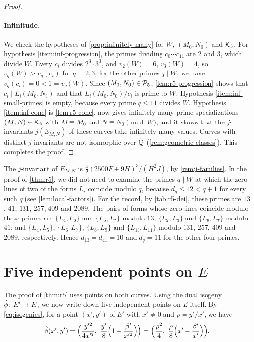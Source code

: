 \begin{proof}
\paragraph{Infinitude.} We check the hypotheses of \cref{prop:infinitely-many} for $W$, $(M_0,N_0)$ and $\mathcal K_5$. For hypothesis \ref{item:inf-progression}, the primes dividing $c_0\cdots c_{11}$ are $2$ and $3$, which divide $W$. Every $c_i$ divides $2^3\cdot3^3$, and $v_2(W)=6$, $v_3(W)=4$, so $v_q(W)>v_q(c_i)$ for $q=2,3$; for the other primes $q\mid W$, we have $v_q(c_i)=0<1=v_q(W)$. Since $(M_0,N_0)\in\mathcal P_5$, \cref{lem:r5-progression} shows that $c_i\mid L_i(M_0,N_0)$ and that $L_i(M_0,N_0)/c_i$ is prime to $W$. Hypothesis \ref{item:inf-small-primes} is empty, because every prime $q\le11$ divides $W$. Hypothesis \ref{item:inf-cone} is \cref{lem:r5-cone}.  now gives infinitely many prime specializations $(M,N)\in\mathcal K_5$ with $M\equiv M_0$ and $N\equiv N_0\pmod W$, and it shows that the $j$-invariants $j(E_{M,N})$ of these curves take infinitely many values. Curves with distinct $j$-invariants are not isomorphic over $\overline{\mathbb Q}$ (\cref{rem:geometric-classes}). This completes the proof.
\end{proof}

\begin{remark}\label{rem:r5-j}
The $j$-invariant of $E_{M,N}$ is $\tfrac49(2500F+9H)^3/(H^2J)$, by \cref{rem:j-families}. In the proof of \cref{thm:r5}, we did not need to examine the primes $q\nmid W$ at which the zero lines of two of the forms $L_i$ coincide modulo $q$, because $d_q\le12<q+1$ for every such $q$ (see \cref{lem:local-factors}). For the record, by \cref{tab:r5-det}, these primes are $13$, $41$, $131$, $257$, $409$ and $2089$. The pairs of forms whose zero lines coincide modulo these primes are $\{L_4,L_6\}$ and $\{L_5,L_7\}$ modulo $13$; $\{L_2,L_3\}$ and $\{L_6,L_7\}$ modulo $41$; and $\{L_4,L_5\}$, $\{L_6,L_7\}$, $\{L_8,L_9\}$ and $\{L_{10},L_{11}\}$ modulo $131$, $257$, $409$ and $2089$, respectively. Hence $d_{13}=d_{41}=10$ and $d_q=11$ for the other four primes.
\end{remark}

\section{Five independent points on \texorpdfstring{$E$}{E}}\label{sec:r5-five-points}

The proof of \cref{thm:r5} uses points on both curves. Using the dual isogeny $\hat\phi\colon E'\to E$, we now write down five independent points on $E$ itself. By \eqref{eq:isogenies}, for a point $(x',y')$ of $E'$ with $x'\ne0$ and $\rho=y'/x'$, we have
\begin{equation}\label{r5:dual-formula}
\dual(x',y')=\Big(\frac{y'^2}{4x'^2},\ \frac{y'}8\Big(1-\frac{\beta'}{x'^2}\Big)\Big)=\Big(\frac{\rho^2}4,\ \frac\rho8\Big(x'-\frac{\beta'}{x'}\Big)\Big).
\end{equation}

